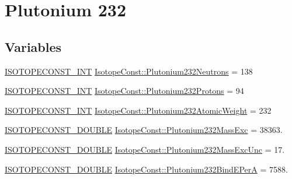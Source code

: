 \hypertarget{group___isotope_const-_plutonium-_pu232}{}\section{Plutonium 232}
\label{group___isotope_const-_plutonium-_pu232}
\subsection*{Variables}
\begin{DoxyCompactItemize}
\item 
\mbox{\hyperlink{group___isotope_const-_macros_ga5f18360b3e99483a35c32d789e62621c}{I\+S\+O\+T\+O\+P\+E\+C\+O\+N\+S\+T\+\_\+\+I\+NT}} \mbox{\hyperlink{group___isotope_const-_plutonium-_pu232_ga4cb56f42138a0c6e2e0a5e1f18d04c62}{Isotope\+Const\+::\+Plutonium232\+Neutrons}} = 138
\item 
\mbox{\hyperlink{group___isotope_const-_macros_ga5f18360b3e99483a35c32d789e62621c}{I\+S\+O\+T\+O\+P\+E\+C\+O\+N\+S\+T\+\_\+\+I\+NT}} \mbox{\hyperlink{group___isotope_const-_plutonium-_pu232_gae7b61ffa2d38076a6dd42fc1abdcec74}{Isotope\+Const\+::\+Plutonium232\+Protons}} = 94
\item 
\mbox{\hyperlink{group___isotope_const-_macros_ga5f18360b3e99483a35c32d789e62621c}{I\+S\+O\+T\+O\+P\+E\+C\+O\+N\+S\+T\+\_\+\+I\+NT}} \mbox{\hyperlink{group___isotope_const-_plutonium-_pu232_ga99b7fc6f390f42861cec5172195b58e4}{Isotope\+Const\+::\+Plutonium232\+Atomic\+Weight}} = 232
\item 
\mbox{\hyperlink{group___isotope_const-_macros_ga8f45a7272ce02c0b4c65c44636ed719a}{I\+S\+O\+T\+O\+P\+E\+C\+O\+N\+S\+T\+\_\+\+D\+O\+U\+B\+LE}} \mbox{\hyperlink{group___isotope_const-_plutonium-_pu232_ga959913214cbe886c4d808e70231009e5}{Isotope\+Const\+::\+Plutonium232\+Mass\+Exc}} = 38363.
\item 
\mbox{\hyperlink{group___isotope_const-_macros_ga8f45a7272ce02c0b4c65c44636ed719a}{I\+S\+O\+T\+O\+P\+E\+C\+O\+N\+S\+T\+\_\+\+D\+O\+U\+B\+LE}} \mbox{\hyperlink{group___isotope_const-_plutonium-_pu232_ga0d72b29e494f27e9d1436d39be89213f}{Isotope\+Const\+::\+Plutonium232\+Mass\+Exc\+Unc}} = 17.
\item 
\mbox{\hyperlink{group___isotope_const-_macros_ga8f45a7272ce02c0b4c65c44636ed719a}{I\+S\+O\+T\+O\+P\+E\+C\+O\+N\+S\+T\+\_\+\+D\+O\+U\+B\+LE}} \mbox{\hyperlink{group___isotope_const-_plutonium-_pu232_gaaa7d72f661d86a23330edb28e5255312}{Isotope\+Const\+::\+Plutonium232\+Bind\+E\+PerA}} = 7588.
\item 

\end{DoxyCompactItemize}
